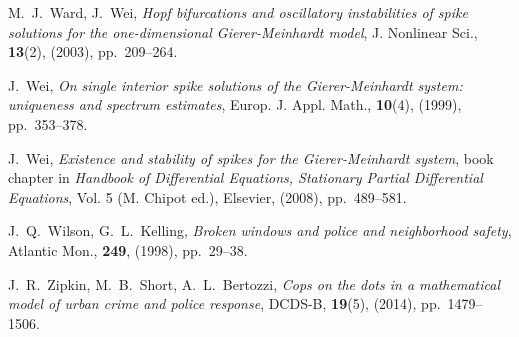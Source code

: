 \documentclass{article}%
\begin{document}
\begin{thebibliography}{99}
 M.~J.~Ward, J.~Wei, \textit{Hopf bifurcations and
  oscillatory instabilities of spike solutions for the one-dimensional
  Gierer-Meinhardt model}, J. Nonlinear Sci., \textbf{13}(2), (2003),
  pp.~209--264.

 J.~Wei, \textit{On single interior spike solutions of
  the Gierer-Meinhardt system: uniqueness and spectrum
  estimates}, Europ. J. Appl. Math., \textbf{10}(4), (1999),
  pp.~353--378.

 J.~Wei, \textit{Existence and stability
of spikes for the Gierer-Meinhardt system}, book chapter in \textit{Handbook
of Differential Equations, Stationary Partial Differential Equations},
Vol. 5 (M. Chipot ed.), Elsevier, (2008), pp.~489--581.

 J.~Q.~Wilson, G.~L.~Kelling, \textit{Broken windows and
  police and neighborhood safety}, Atlantic Mon., \textbf{249},
  (1998), pp.~29--38.

 J.~R.~Zipkin, M.~B.~Short, A.~L.~Bertozzi,
  \textit{Cops on the dots in a mathematical model of urban crime and
    police response}, DCDS-B, \textbf{19}(5), (2014), pp.~1479--1506.

\end{thebibliography}
\end{document}
